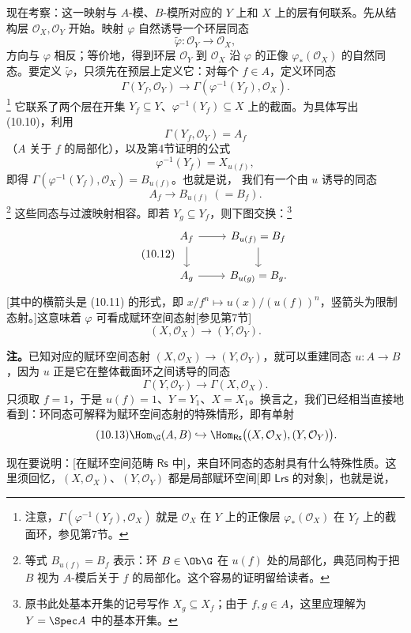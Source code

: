 现在考察：这一映射与 $A$-模、$B$-模所对应的 $Y$ 上和 $X$ 上的层有何联系。先从结构层 $\mathcal O_X,\mathcal O_Y$ 开始。映射 $\varphi$ 自然诱导一个环层同态
\begin{equation}\tag{10.9}
\widetilde\varphi:\mathcal O_Y\longrightarrow\mathcal O_X,
\end{equation}
方向与 $\varphi$ 相反；等价地，得到环层 $\mathcal O_Y$ 到 $\mathcal O_X$ 沿 $\varphi$ 的正像 $\varphi_*(\mathcal O_X)$ 的自然同态。要定义 $\widetilde\varphi$，只须先在预层上定义它：对每个 $f\in A$，定义环同态
\begin{equation}\tag{10.10}
\Gamma(Y_f,\mathcal O_Y)\longrightarrow
\Gamma(\varphi^{-1}(Y_f),\mathcal O_X).
\end{equation}
\footnote{注意，$\Gamma(\varphi^{-1}(Y_f),\mathcal O_X)$ 就是 $\mathcal O_X$ 在 $Y$ 上的正像层 $\varphi_*(\mathcal O_X)$ 在 $Y_f$ 上的截面环，参见第7节。}
它联系了两个层在开集 $Y_f\subseteq Y$、$\varphi^{-1}(Y_f)\subseteq X$ 上的截面。为具体写出 (10.10)，利用
\[
\Gamma(Y_f,\mathcal O_Y)=A_f
\]
（$A$ 关于 $f$ 的局部化），以及第4节证明的公式
\[
\varphi^{-1}(Y_f)=X_{u(f)},
\]
即得 $\Gamma(\varphi^{-1}(Y_f),\mathcal O_X)=B_{u(f)}$。也就是说，
我们有一个由 $u$ 诱导的同态
\begin{equation}\tag{10.11}
A_f\longrightarrow B_{u(f)}\ (=B_f).
\end{equation}
\footnote{等式 $B_{u(f)}=B_f$ 表示：环 $B\in\Ob\G$ 在 $u(f)$ 处的局部化，典范同构于把 $B$ 视为 $A$-模后关于 $f$ 的局部化。这个容易的证明留给读者。}
这些同态与过渡映射相容。即若 $Y_g\subseteq Y_f$，则下图交换：\footnote{原书此处基本开集的记号写作 $X_g\subseteq X_f$；由于 $f,g\in A$，这里应理解为 $Y=\Spec A$ 中的基本开集。}
\begin{equation}\tag{10.12}
\begin{tikzcd}[ampersand replacement=\&]
A_f\arrow[r]\arrow[d]\&B_{u(f)}=B_f\arrow[d]\\
A_g\arrow[r]\&B_{u(g)}=B_g.
\end{tikzcd}
\end{equation}
[其中的横箭头是 (10.11) 的形式，即 $x/f^n\mapsto u(x)/(u(f))^n$，竖箭头为限制态射。]这意味着 $\varphi$ 可看成赋环空间态射[参见第7节]
\[
(X,\mathcal O_X)\longrightarrow(Y,\mathcal O_Y).
\]

\textbf{注。}已知对应的赋环空间态射 $(X,\mathcal O_X)\to(Y,\mathcal O_Y)$，就可以重建同态 $u:A\to B$，因为 $u$ 正是它在整体截面环之间诱导的同态
\[
\Gamma(Y,\mathcal O_Y)\longrightarrow\Gamma(X,\mathcal O_X).
\]
只须取 $f=1$，于是 $u(f)=1$、$Y=Y_1$、$X=X_1$。换言之，我们已经相当直接地看到：环同态可解释为赋环空间态射的特殊情形，即有单射
\begin{equation}\tag{10.13}
\Hom_{\G}(A,B)\hookrightarrow
\Hom_{\mathsf{Rs}}\bigl((X,\mathcal O_X),(Y,\mathcal O_Y)\bigr).
\end{equation}

现在要说明：[在赋环空间范畴 $\mathsf{Rs}$ 中]，来自环同态的态射具有什么特殊性质。这里须回忆，$(X,\mathcal O_X)$、$(Y,\mathcal O_Y)$ 都是局部赋环空间[即 $\mathsf{Lrs}$ 的对象]，也就是说，
